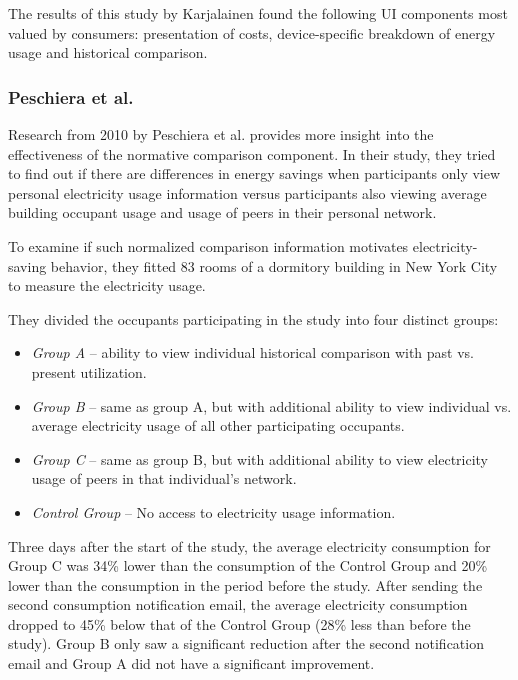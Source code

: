 \documentclass[journal]{vgtc}                %
\begin{document}
The results of this study by Karjalainen found the following UI components most valued by consumers: presentation of costs, device-specific breakdown of energy usage and historical comparison.  %

\subsubsection{Peschiera et al.}
Research from 2010 by Peschiera et al. \cite{peschiera2010response} provides more insight into the effectiveness of the normative comparison component. In their study, they tried to find out if there are differences in energy savings when participants only view personal electricity usage information versus participants also viewing average building occupant usage and usage of peers in their personal network.

To examine if such normalized comparison information motivates electricity-saving behavior, they fitted 83 rooms of a dormitory building in New York City to measure the electricity usage.

They divided the occupants participating in the study into four distinct groups:
\begin{itemize}
\item \textit{Group A} -- ability to view individual historical comparison with past vs. present utilization.
\item \textit{Group B} -- same as group A, but with additional ability to view individual vs. average electricity usage of all other participating occupants.
\item \textit{Group C} -- same as group B, but with additional ability to view electricity usage of peers in that individual's network.
\item \textit{Control Group} -- No access to electricity usage information.
\end{itemize}


Three days after the start of the study, the average electricity consumption for Group C was 34\% lower than the consumption of the Control Group and 20\% lower than the consumption in the period before the study.
After sending the second consumption notification email, the average electricity consumption dropped to 45\% below that of the Control Group (28\% less than before the study).
Group B only saw a significant reduction after the second notification email and Group A did not have a significant improvement.
\end{document}
